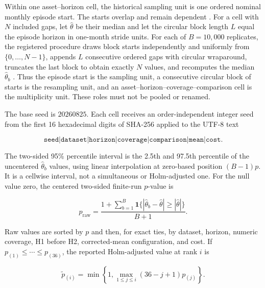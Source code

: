 \documentclass[12pt,a4paper,oneside]{report}
\begin{document}
Within one asset--horizon cell, the historical sampling unit is one ordered
nominal monthly episode start. The starts overlap and remain dependent
\citep{richardsonsmith1991overlap}. For a cell with $N$ included gaps, let
$\widehat{\theta}$ be their median and let the circular block length $L$ equal
the episode horizon in one-month stride units. For each of $B=10{,}000$
replicates, the registered procedure draws block starts
independently and uniformly from $\{0,\ldots,N-1\}$, appends $L$ consecutive
ordered gaps with circular wraparound, truncates the last block to obtain
exactly $N$ values, and recomputes the median $\widehat{\theta}_b$
\citep{kunsch1989blockbootstrap,politisromano1992circular}. Thus the episode
start is the sampling unit, a consecutive circular block of starts is the
resampling unit, and an asset--horizon--coverage--comparison cell is the
multiplicity unit. These roles must not be pooled or renamed.

The base seed is $20260825$. Each cell receives an order-independent integer
seed from the first 16 hexadecimal digits of SHA-256 applied to the UTF-8 text

\begin{equation}
  \texttt{seed|dataset|horizon|coverage|comparison|mean|cost}.
  \label{eq:method-cell-seed}
\end{equation}

The two-sided 95\% percentile interval is the 2.5th and 97.5th percentile of
the uncentered $\widehat{\theta}_b$ values, using linear interpolation at
zero-based position $(B-1)p$. It is a cellwise interval, not a simultaneous or
Holm-adjusted one. For the null value zero, the centered two-sided finite-run
$p$-value is

\begin{equation}
  p_{\mathrm{raw}}
  =\frac{1+\sum_{b=1}^{B}
    \mathbf{1}\{|\widehat{\theta}_b-\widehat{\theta}|
      \geq |\widehat{\theta}|\}}{B+1}.
  \label{eq:method-finite-p}
\end{equation}

Raw values are sorted by $p$ and then, for exact ties, by dataset, horizon,
numeric coverage, H1 before H2, corrected-mean configuration, and cost. If
$p_{(1)}\leq\cdots\leq p_{(36)}$, the reported Holm-adjusted value at rank $i$
is

\begin{equation}
  \widetilde p_{(i)}=
  \min\left\{1,\max_{1\leq j\leq i}(36-j+1)p_{(j)}\right\}.
  \label{eq:method-holm}
\end{equation}
\end{document}
